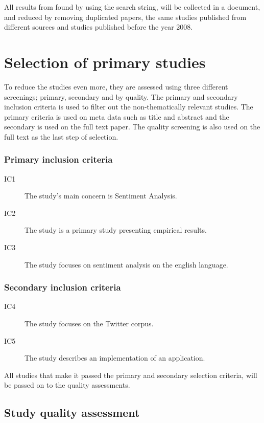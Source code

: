 All results from found by using the search string, will be collected in a document, and reduced by removing duplicated papers, the same studies published from different sources and studies published before the year 2008.


\section{Selection of primary studies}
To reduce the studies even more, they are assessed using three different screenings; primary, secondary and by quality. The primary and secondary inclusion criteria is used to filter out the non-thematically relevant studies. The primary criteria is used on meta data such as title and abstract and the secondary is used on the full text paper. The quality screening is also used on the full text as the last step of selection.

\subsubsection{Primary inclusion criteria}

\begin{description}

\item[IC1] The study’s main concern is Sentiment Analysis.
\item[IC2] The study is a primary study presenting empirical results.
\item[IC3] The study focuses on sentiment analysis on the english language.

\end{description}

\subsubsection{Secondary inclusion criteria}

\begin{description}


\item[IC4] The study focuses on the Twitter corpus.
\item[IC5] The study describes an implementation of an application.

\end{description}

All studies that make it passed the primary and secondary selection criteria, will be passed on to the quality assessments. 

\subsection{Study quality assessment}

